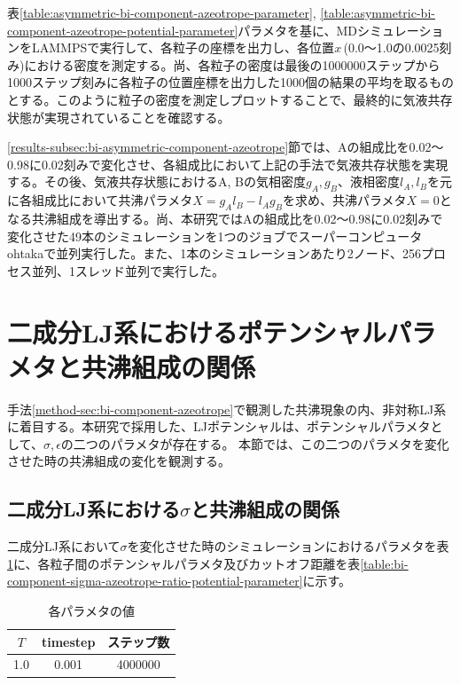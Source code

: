 \documentclass[titlepage]{jsreport}
\begin{document}
表\ref{table:asymmetric-bi-component-azeotrope-parameter}, \ref{table:asymmetric-bi-component-azeotrope-potential-parameter}パラメタを基に、MDシミュレーションをLAMMPSで実行して、各粒子の座標を出力し、各位置$x$\,(0.0〜1.0の0.0025刻み)における密度を測定する。尚、各粒子の密度は最後の1000000ステップから1000ステップ刻みに各粒子の位置座標を出力した1000個の結果の平均を取るものとする。このように粒子の密度を測定しプロットすることで、最終的に気液共存状態が実現されていることを確認する。

\ref{results-subsec:bi-asymmetric-component-azeotrope}節では、Aの組成比を0.02〜0.98に0.02刻みで変化させ、各組成比において上記の手法で気液共存状態を実現する。その後、気液共存状態におけるA, Bの気相密度$g_A, g_B$、液相密度$l_A, l_B$を元に各組成比において共沸パラメタ$X=g_Al_B-l_Ag_B$を求め、共沸パラメタ$X=0$となる共沸組成を導出する。尚、本研究ではAの組成比を0.02〜0.98に0.02刻みで変化させた49本のシミュレーションを1つのジョブでスーパーコンピュータohtakaで並列実行した。また、1本のシミュレーションあたり2ノード、256プロセス並列、1スレッド並列で実行した。


\section{二成分LJ系におけるポテンシャルパラメタと共沸組成の関係} \label{method-sec:bi-component-potential-parameter-azeotrope-ratio}
手法\ref{method-sec:bi-component-azeotrope}で観測した共沸現象の内、非対称LJ系に着目する。本研究で採用した、LJポテンシャルは、ポテンシャルパラメタとして、${\sigma}$,\,${\epsilon}$の二つのパラメタが存在する。
本節では、この二つのパラメタを変化させた時の共沸組成の変化を観測する。


\subsection{二成分LJ系における$\sigma$と共沸組成の関係} \label{method-subsec:bi-component-sigma-azeotrope-ratio}
二成分LJ系において${\sigma}$を変化させた時のシミュレーションにおけるパラメタを表\ref{table:bi-component-sigma-azeotrope-ratio-parameter}に、各粒子間のポテンシャルパラメタ及びカットオフ距離を表\ref{table:bi-component-sigma-azeotrope-ratio-potential-parameter}に示す。

\begin{table}[htbp]
    \begin{center}
        \caption{各パラメタの値}
        \label{table:bi-component-sigma-azeotrope-ratio-parameter}
        \begin{tabular}{c c c}
            $T$ & timestep & ステップ数 \\
            \hline
            1.0 & 0.001 & 4000000 \\
        \end{tabular}
    \end{center}
\end{table}
\end{document}
